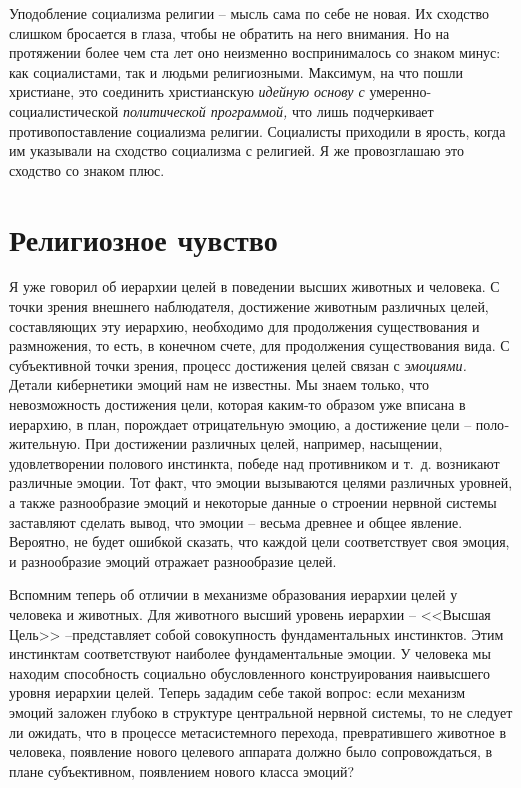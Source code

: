 \documentclass{book}
\begin{document}
Уподобление социализма религии -- мысль сама по себе не новая. Их сходство слишком бросается в глаза, чтобы не обра­тить на него внимания. Но на протяжении более чем ста лет оно неизменно воспринималось со знаком минус: как социа­листами, так и людьми религиозными. Максимум, на что пошли христиане, это соединить христианскую \textit{идейную основу с}  уме­ренно-социалистической \textit{политической программой,}  что лишь подчеркивает противопоставление социализма религии. Социа­листы приходили в ярость, когда им указывали на сходство социализма с религией. Я же провозглашаю это сходство со знаком плюс.


\section{Религиозное чувство}

Я уже говорил об иерархии целей в поведении высших живот­ных и человека. С точки зрения внешнего наблюдателя, достиже­ние животным различных целей, составляющих эту иерархию, необходимо для продолжения существования и размножения, то есть, в конечном счете, для продолжения существования вида. С субъективной точки зрения, процесс достижения целей связан с \textit{эмоциями.}  Детали кибернетики эмоций нам не извест­ны. Мы знаем только, что невозможность достижения цели, которая каким-то образом уже вписана в иерархию, в план, порождает отрицательную эмоцию, а достижение цели -- поло­жительную. При достижении различных целей, например, насыщении, удовлетворении полового инстинкта, победе над противником и т.~д. возникают различные эмоции. Тот факт, что эмоции вызываются целями различных уровней, а также разнообразие эмоций и некоторые данные о строении нервной системы заставляют сделать вывод, что эмоции -- весьма древнее и общее явление. Вероятно, не будет ошибкой сказать, что каждой цели соответствует своя 
эмоция, и 
разнообразие эмоций отражает разнообразие целей.

Вспомним теперь об отличии в механизме образования иерархии целей у человека и животных. Для животного высший уро­вень иерархии -- <<Высшая Цель>> --представляет собой совокуп­ность фундаментальных инстинктов. Этим инстинктам соот­ветствуют наиболее фундаментальные эмоции. У человека мы находим способность социально обусловленного конструиро­вания наивысшего уровня иерархии целей. Теперь зададим се­бе такой вопрос: если механизм эмоций заложен глубоко в структуре центральной нервной системы, то не следует ли ожи­дать, что в процессе метасистемного перехода, превратившего животное в человека, появление нового целевого аппарата должно было сопровождаться, в плане субъективном, появле­нием нового класса эмоций?
\end{document}
